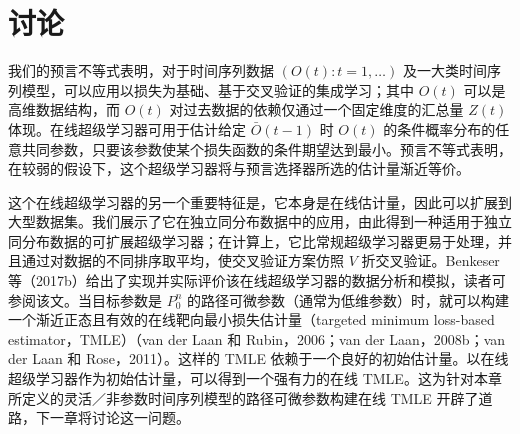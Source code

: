 \section{讨论}

我们的预言不等式表明，对于时间序列数据 $(O(t):t=1,\ldots)$ 及一大类时间序列模型，可以应用以损失为基础、基于交叉验证的集成学习；其中 $O(t)$ 可以是高维数据结构，而 $O(t)$ 对过去数据的依赖仅通过一个固定维度的汇总量 $Z(t)$ 体现。在线超级学习器可用于估计给定 $\bar O(t-1)$ 时 $O(t)$ 的条件概率分布的任意共同参数，只要该参数使某个损失函数的条件期望达到最小。预言不等式表明，在较弱的假设下，这个超级学习器将与预言选择器所选的估计量渐近等价。

这个在线超级学习器的另一个重要特征是，它本身是在线估计量，因此可以扩展到大型数据集。我们展示了它在独立同分布数据中的应用，由此得到一种适用于独立同分布数据的可扩展超级学习器；在计算上，它比常规超级学习器更易于处理，并且通过对数据的不同排序取平均，使交叉验证方案仿照 $V$ 折交叉验证。Benkeser 等（2017b）给出了实现并实际评价该在线超级学习器的数据分析和模拟，读者可参阅该文。当目标参数是 $P_0^n$ 的路径可微参数（通常为低维参数）时，就可以构建一个渐近正态且有效的在线靶向最小损失估计量（targeted minimum loss-based estimator，TMLE）（van der Laan 和 Rubin，2006；van der Laan，2008b；van der Laan 和 Rose，2011）。这样的 TMLE 依赖于一个良好的初始估计量。以在线超级学习器作为初始估计量，可以得到一个强有力的在线 TMLE。这为针对本章所定义的灵活／非参数时间序列模型的路径可微参数构建在线 TMLE 开辟了道路，下一章将讨论这一问题。
\clearpage
\endgroup
